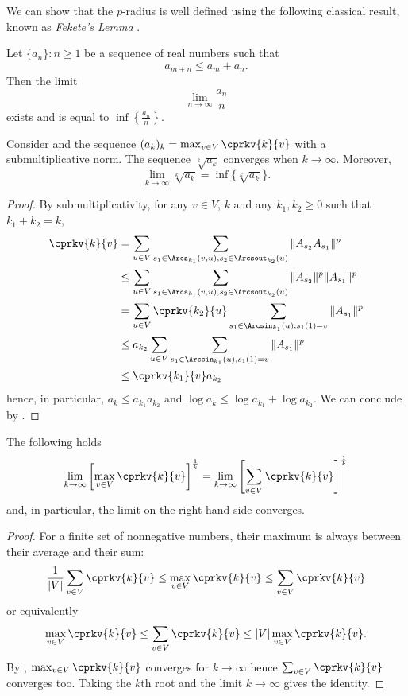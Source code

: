 We can show that the $p$-radius is well defined using the following classical result, known as \emph{Fekete's Lemma} \cite{fekete1923verteilung}.
\begin{lemma}
  \label{lem:fekete}
  Let $\{a_n\} : n \geq 1$ be a sequence of real numbers such that
  \[ a_{m + n} \leq a_m + a_n. \]
  Then the limit
  \[ \lim_{n \to \infty} \frac{a_n}{n} \]
  exists and is equal to $\inf\left\{\frac{a_n}{n}\right\}$.
\end{lemma}
\begin{lemma}
  \label{lem:feketemax}
  Consider  and
  the sequence $(a_k)_k = \max_{v \in V} \cprkv{k}{v}$ with a submultiplicative norm.
  The sequence $\sqrt[k]{a_k}$ converges when $k \to \infty$.
  Moreover,
  \[ \lim_{k \to \infty} \sqrt[k]{a_k} = \inf \{\sqrt[k]{a_k}\}. \]

  \begin{proof}
    By submultiplicativity, for any $v \in V$, $k$ and any $k_1,k_2 \geq 0$ such that $k_1 + k_2 = k$,
    \begin{align*}
      \cprkv{k}{v}
      & = \sum_{u \in V} \sum_{s_1 \in \Arcs_{k_1}(v,u),s_2\in \Arcsout_{k_2}(u)} \|A_{s_2}A_{s_1}\|^p\\
      & \leq \sum_{u \in V} \sum_{s_1 \in \Arcs_{k_1}(v,u),s_2\in \Arcsout_{k_2}(u)} \|A_{s_2}\|^p\|A_{s_1}\|^p\\
      & = \sum_{u \in V} \cprkv{k_2}{u} \sum_{s_1 \in \Arcsin_{k_1}(u),s_1(1)=v} \|A_{s_1}\|^p\\
      & \leq a_{k_2} \sum_{u \in V} \sum_{s_1 \in \Arcsin_{k_1}(u),s_1(1)=v} \|A_{s_1}\|^p\\
      & \leq \cprkv{k_1}{v} a_{k_2}
    \end{align*}
    hence, in particular, $a_k \leq a_{k_1} a_{k_2}$ and $\log a_k \leq \log a_{k_1} + \log a_{k_2}$.
    We can conclude by .
  \end{proof}
\end{lemma}

\begin{corollary}
  \label{coro:summax}
  The following holds
  \[ \lim_{k \to \infty} \left[\max_{v \in V} \cprkv{k}{v}\right]^{\frac{1}{k}} = \lim_{k \to \infty} \left[\sum_{v \in V} \cprkv{k}{v}\right]^{\frac{1}{k}} \]
  and, in particular, the limit on the right-hand side converges.

  \begin{proof}
    For a finite set of nonnegative numbers, their maximum is always between their average and their sum:
    \[ \frac{1}{|V|} \sum_{v \in V} \cprkv{k}{v} \leq \max_{v \in V} \cprkv{k}{v} \leq \sum_{v \in V} \cprkv{k}{v} \]
    or equivalently
    \[ \max_{v \in V} \cprkv{k}{v} \leq \sum_{v \in V} \cprkv{k}{v} \leq |V| \max_{v \in V} \cprkv{k}{v}. \]
    By , $\max_{v \in V} \cprkv{k}{v}$ converges for $k \to \infty$ hence $\sum_{v \in V} \cprkv{k}{v}$ converges too.
    Taking the $k$th root and the limit $k \to \infty$ gives the identity.
  \end{proof}
\end{corollary}

